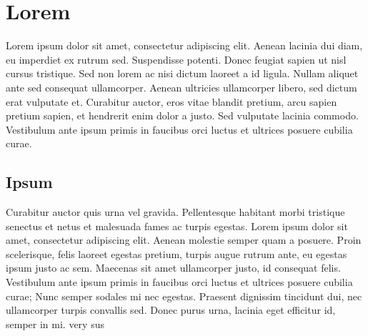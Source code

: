 \section{Lorem}
Lorem ipsum dolor sit amet, consectetur adipiscing elit. Aenean lacinia dui diam, eu imperdiet ex rutrum sed. Suspendisse potenti. Donec feugiat sapien ut nisl cursus tristique. Sed non lorem ac nisi dictum laoreet a id ligula. \parencite{knuthwebsite} Nullam aliquet ante sed consequat ullamcorper. Aenean ultricies ullamcorper libero, sed dictum erat vulputate et. Curabitur auctor, eros vitae blandit pretium, arcu sapien pretium sapien, et hendrerit enim dolor a justo. Sed vulputate lacinia commodo. Vestibulum ante ipsum primis in faucibus orci luctus et ultrices posuere cubilia curae. \parencite{latexcompanion}

\subsection{Ipsum}
Curabitur auctor quis urna vel gravida. Pellentesque habitant morbi tristique senectus et netus et malesuada fames ac turpis egestas. Lorem ipsum dolor sit amet, consectetur adipiscing elit. Aenean molestie semper quam a posuere. Proin scelerisque, felis laoreet egestas pretium, turpis augue rutrum ante, eu egestas ipsum justo ac sem. Maecenas sit amet ullamcorper justo, id consequat felis. Vestibulum ante ipsum primis in faucibus orci luctus et ultrices posuere cubilia curae; Nunc semper sodales mi nec egestas. Praesent dignissim tincidunt dui, nec ullamcorper turpis convallis sed. Donec purus urna, lacinia eget efficitur id, semper in mi. very sus  \parencite["WRITE PAGE NUMBER HERE LIKE p.10 etc]{einstein}


